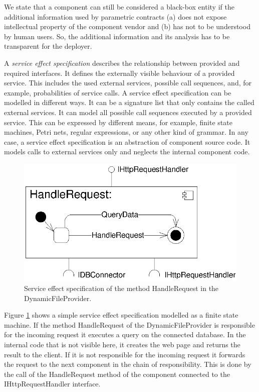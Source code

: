 We state that a component can still be considered a black-box entity if the
additional information used by parametric contracts (a) does not expose
intellectual property of the component vendor and (b) has not to be understood
by human users. So, the additional information and its analysis has to be
transparent for the deployer.

A \emph{service effect specification} describes the relationship between
provided and required interfaces. It defines the externally visible behaviour of
a provided service. This includes the used external services, possible call
sequences, and, for example, probabilities of service calls. A service effect
specification can be modelled in different ways. It can be a signature list that
only contains the called external services. It can model all possible call
sequences executed by a provided service. This can be expressed by different
means, for example, finite state machines, Petri nets, regular expressions, or
any other kind of grammar. In any case, a service effect specification is an
abstraction of component source code. It models calls to external services only
and neglects the internal component code.

\begin{figure}[htbp]
\centering
\includegraphics[scale=0.85]{example/HandleRequestSEFF}
\caption{Service effect specification of the method HandleRequest in the
DynamicFileProvider.}
\label{fig:seff}
\end{figure}

Figure \ref{fig:seff} shows a simple service effect specification modelled as a
finite state machine. If the method HandleRequest of the DynamicFileProvider is
responsible for the incoming request it executes a query on the connected
database. In the internal code that is not visible here, it creates the web page
and returns the result to the client. If it is not responsible for the incoming
request it forwards the request to the next component in the chain of
responsibility. This is done by the call of the HandleRequest method of the
component connected to the IHttpRequestHandler interface.


